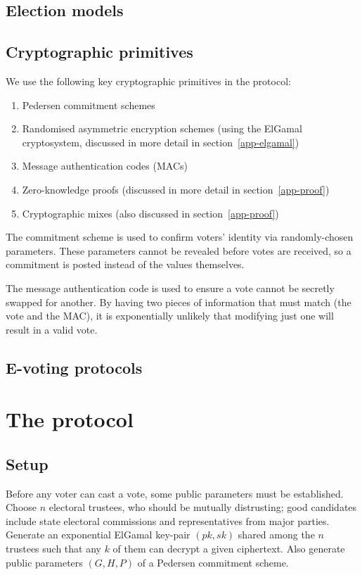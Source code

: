 \documentclass[11pt,twoside,a4paper]{article}
\theoremstyle{definition}
\begin{document}
\subsection{Election models}
\subsection{Cryptographic primitives}
We use the following key cryptographic primitives in the protocol:
\begin{enumerate}
    \item Pedersen commitment schemes
    \item Randomised asymmetric encryption schemes (using the ElGamal cryptosystem, discussed in more detail in section~\ref{app-elgamal})
    \item Message authentication codes (MACs)
    \item Zero-knowledge proofs (discussed in more detail in section~\ref{app-proof})
    \item Cryptographic mixes (also discussed in section~\ref{app-proof})
\end{enumerate}
The commitment scheme is used to confirm voters' identity via randomly-chosen parameters. These parameters cannot be revealed before votes are received, so a commitment is posted instead of the values themselves.

The message authentication code is used to ensure a vote cannot be secretly swapped for another. By having two pieces of information that must match (the vote and the MAC), it is exponentially unlikely that modifying just one will result in a valid vote.
\subsection{E-voting protocols}
\section{The protocol}\label{sec-protocol}
\subsection{Setup}
Before any voter can cast a vote, some public parameters must be established. Choose \(n\) electoral trustees, who should be mutually distrusting; good candidates include state electoral commissions and representatives from major parties. Generate an exponential ElGamal key-pair \((pk, sk)\) shared among the \(n\) trustees such that any \(k\) of them can decrypt a given ciphertext. Also generate public parameters \((G, H, P)\) of a Pedersen commitment scheme.
\end{document}

